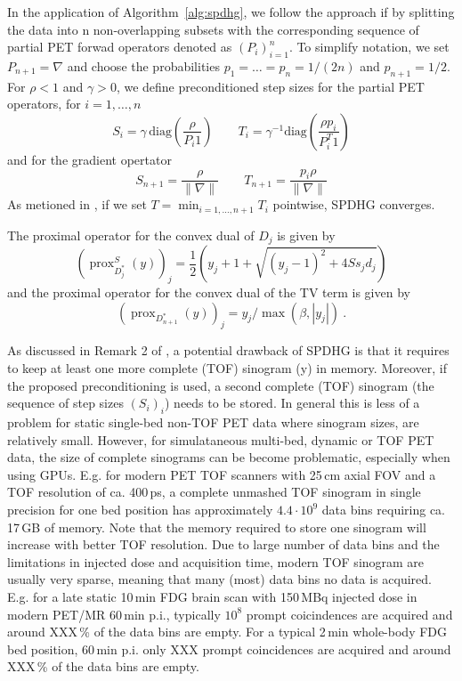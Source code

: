 \documentclass[11pt,twocolumn,twoside]{article}
\DeclareMathOperator{\prox}{prox}
\begin{document}
In the application of Algorithm~\ref{alg:spdhg}, we follow the approach if \cite{Ehrhardt2019}
by splitting the data into n non-overlapping subsets with the corresponding 
sequence of partial PET forwad operators denoted as $(P_i)_{i=1}^n$.
To simplify notation, we set $P_{n+1} = \nabla$ and choose the probabilities $p_1=\ldots=p_n = 1/(2n)$
and $p_{n+1} = 1/2$.
For $\rho<1$ and $\gamma>0$, we define preconditioned step sizes for the partial PET operators, 
for $i=1,\ldots,n$
\[ S_i = \gamma \, \text{diag}(\frac{\rho}{P_i 1} )\qquad  T_i = \gamma^{-1} \text{diag}(\frac{\rho p_i}{P^T_i 1}) \]
and for the gradient opertator
\[ S_{n+1} = \frac{\rho}{\|\nabla\|} \qquad T_{n+1} = \frac{p_i\rho}{\|\nabla\|} \]  
As metioned in \cite{Ehrhardt2019}, if we set $T = \min_{i=1,\ldots,n+1} T_i$ pointwise,
SPDHG converges.

The proximal operator for the convex dual of $D_j$ is given by
\begin{equation}
(\prox_{D_j^*}^{S}(y))_j = \frac{1}{2} \left(y_j + 1 + \sqrt{ (y_j-1)^2 + 4 S s_j d_j} \right)
\label{eq:proxD}
\end{equation} 
and the proximal operator for the convex dual of the TV term is given by
\begin{equation}
(\prox_{D_{n+1}^*}(y) )_j = y_j /\max(\beta,|y_j|) \ .
\end{equation}

As discussed in Remark 2 of \cite{Ehrhardt2019}, a potential drawback of SPDHG is that it requires
to keep at least one more complete (TOF) sinogram (y) in memory. 
Moreover, if the proposed preconditioning is used, a second complete (TOF) sinogram
(the sequence of step sizes $(S_i)_i$) needs to be stored.
In general this is less of a problem for static single-bed non-TOF PET data where sinogram sizes, 
are relatively small.
However, for simulataneous multi-bed, dynamic or TOF PET data, the size of complete sinograms
can be become problematic, especially when using GPUs.
E.g. for modern PET TOF scanners with 25\,cm axial FOV and a TOF resolution of ca. 400\,ps, 
a complete unmashed TOF sinogram in single precision for one bed position 
has approximately $4.4\cdot10^9$ data bins requiring ca. 17\,GB of memory.
Note that the memory required to store one sinogram will increase with better TOF resolution.
Due to large number of data bins and the limitations in injected dose and acquisition time,
modern TOF sinogram are usually very sparse, meaning that many (most) data bins no data is
acquired.
E.g. for a late static 10\,min FDG brain scan with 150\,MBq injected dose in modern PET/MR 
60\,min p.i., typically $10^8$ prompt coicindences are acquired and around XXX\,\% of the
data bins are empty.
For a typical 2\,min whole-body FDG bed position, 60\,min p.i. only XXX prompt coincidences
are acquired and around XXX\,\% of the data bins are empty.
\end{document}
